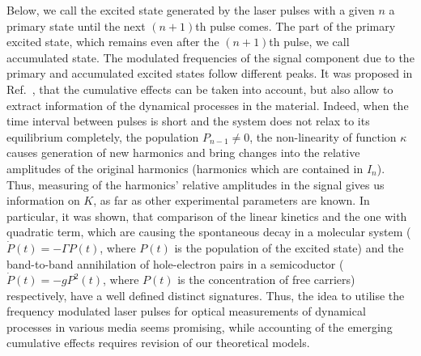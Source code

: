 \documentclass[prb,twocolumn,showpacs,epsfig,epsf]{revtex4}
\newcommand{\1}{\mathds{1}}
\begin{document}
Below, we call the excited state generated by the laser pulses with a given $n$ a primary state until the next $(n+1)$th pulse comes. The part of the primary excited state, which remains even after the $(n+1)$th pulse, we call accumulated state. The modulated frequencies of the signal component due to the primary and accumulated excited states follow different peaks.
It was proposed in Ref.~\cite{our}, that the cumulative effects can be taken into account, but also allow to extract information of the dynamical processes in the material. Indeed, when the time interval between pulses is short and the system does not relax to its equilibrium completely, the population $P_{n-1}\ne 0$, the non-linearity of function $\kappa$ causes generation of new harmonics and bring changes into the relative amplitudes of the original harmonics (harmonics which are contained in $I_n$). Thus, measuring of the harmonics' relative amplitudes in the signal gives us information on $K$, as far as other experimental parameters are known. In particular, it was shown, that comparison of the linear kinetics and the one with quadratic term, which are causing the spontaneous decay in a molecular system ($\dot P(t)=-\Gamma P(t)$, where $P(t)$ is the population of the excited state) and the band-to-band annihilation of hole-electron pairs in a semicoductor ($\dot P(t)=-g P^2(t)$, where $P(t)$ is the concentration of free carriers) respectively, have a well defined distinct signatures. Thus, the idea to utilise the frequency modulated laser pulses for optical measurements of dynamical processes in various media seems promising, while accounting of the emerging cumulative effects requires revision of our theoretical models.
\end{document}
